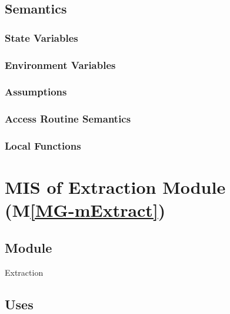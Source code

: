\documentclass[12pt, titlepage]{article}
\newcommand{\mref}[1]{M\ref{MG-#1}}
\begin{document}
\subsection{Semantics}

\subsubsection{State Variables}


\subsubsection{Environment Variables}


\subsubsection{Assumptions}


\subsubsection{Access Routine Semantics}


\subsubsection{Local Functions}


\newpage

\section{MIS of Extraction Module (\mref{mExtract})} \label{mis-mExtract}

\subsection{Module}

Extraction

\subsection{Uses}
\end{document}
